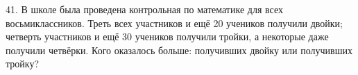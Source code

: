 41. В школе была проведена контрольная по математике для всех восьмиклассников. Треть всех участников и ещё 20 учеников получили двойки; четверть участников и ещё 30 учеников получили тройки, а некоторые даже получили четвёрки. Кого оказалось больше: получивших двойку или получивших тройку?\\
